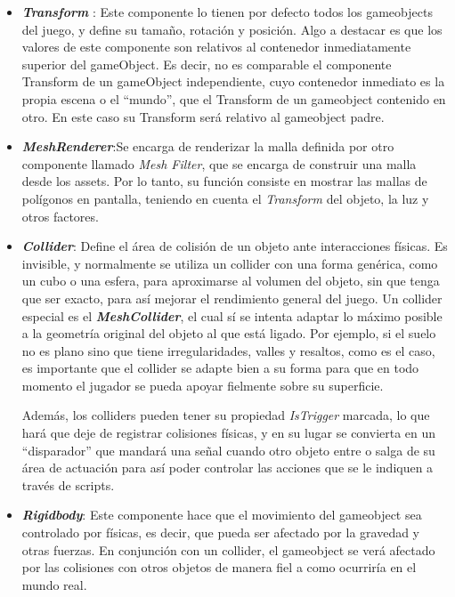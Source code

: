 \begin{itemize}
\tightlist
\item \textbf{\textit{Transform}} \cite{doc:Transform}: Este componente lo tienen por defecto todos los gameobjects del juego, y define su tamaño, rotación y posición. Algo a destacar es que los valores de este componente son relativos al contenedor inmediatamente superior del gameObject. Es decir, no es comparable el componente Transform de un gameObject independiente, cuyo contenedor inmediato es la propia escena o el ``mundo'', que el Transform de un gameobject contenido en otro. En este caso su Transform será relativo al gameobject padre.
\item \textbf{\textit{MeshRenderer}}\cite{doc:Transform}:Se encarga de renderizar la malla definida por otro componente llamado \textit{Mesh Filter}, que se encarga de construir una malla desde los assets. Por lo tanto, su función consiste en mostrar las mallas de polígonos en pantalla, teniendo en cuenta el \textit{Transform} del objeto, la luz y otros factores.
\item \textbf{\textit{Collider}}\cite{doc:Collider}: Define el área de colisión de un objeto ante interacciones físicas. Es invisible, y normalmente se utiliza un collider con una forma genérica, como un cubo o una esfera, para aproximarse al volumen del objeto, sin que tenga que ser exacto, para así mejorar el rendimiento general del juego.
Un collider especial es el \textbf{\textit{MeshCollider}}, el cual sí se intenta adaptar lo máximo posible a la geometría original del objeto al que está ligado. Por ejemplo, si el suelo no es plano sino que tiene irregularidades, valles y resaltos, como es el caso, es importante que el collider se adapte bien a su forma para que en todo momento el jugador se pueda apoyar fielmente sobre su superficie.

Además, los colliders pueden tener su propiedad \textit{IsTrigger} marcada, lo que hará que deje de registrar colisiones físicas, y en su lugar se convierta en un ``disparador'' que mandará una señal cuando otro objeto entre o salga de su área de actuación para así poder controlar las acciones que se le indiquen a través de scripts.
\item \textbf{\textit{Rigidbody}}\cite{doc:Rigidbody}: Este componente hace que el movimiento del gameobject sea controlado por físicas, es decir, que pueda ser afectado por la gravedad y otras fuerzas. En conjunción con un collider, el gameobject se verá afectado por las colisiones con otros objetos de manera fiel a como ocurriría en el mundo real.


\end{itemize}

